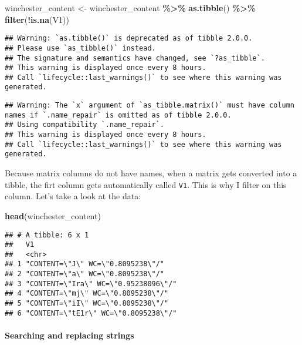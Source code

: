 \documentclass[
]{article}
\newenvironment{Shaded}{\begin{snugshade}}{\end{snugshade}}
\newcommand{\KeywordTok}[1]{\textcolor[rgb]{0.13,0.29,0.53}{\textbf{#1}}}
\newcommand{\NormalTok}[1]{#1}
\newcommand{\OperatorTok}[1]{\textcolor[rgb]{0.81,0.36,0.00}{\textbf{#1}}}
\newcommand{\StringTok}[1]{\textcolor[rgb]{0.31,0.60,0.02}{#1}}
\begin{document}
\begin{Shaded}
\begin{Highlighting}[]
\NormalTok{winchester\_content \textless{}{-}}\StringTok{ }\NormalTok{winchester\_content }\OperatorTok{\%\textgreater{}\%}
\StringTok{  }\KeywordTok{as.tibble}\NormalTok{() }\OperatorTok{\%\textgreater{}\%}
\StringTok{  }\KeywordTok{filter}\NormalTok{(}\OperatorTok{!}\KeywordTok{is.na}\NormalTok{(V1))}
\end{Highlighting}
\end{Shaded}

\begin{verbatim}
## Warning: `as.tibble()` is deprecated as of tibble 2.0.0.
## Please use `as_tibble()` instead.
## The signature and semantics have changed, see `?as_tibble`.
## This warning is displayed once every 8 hours.
## Call `lifecycle::last_warnings()` to see where this warning was generated.
\end{verbatim}

\begin{verbatim}
## Warning: The `x` argument of `as_tibble.matrix()` must have column names if `.name_repair` is omitted as of tibble 2.0.0.
## Using compatibility `.name_repair`.
## This warning is displayed once every 8 hours.
## Call `lifecycle::last_warnings()` to see where this warning was generated.
\end{verbatim}

Because matrix columns do not have names, when a matrix gets converted into a tibble, the firt column
gets automatically called \texttt{V1}. This is why I filter on this column. Let's take a look at the data:

\begin{Shaded}
\begin{Highlighting}[]
\KeywordTok{head}\NormalTok{(winchester\_content)}
\end{Highlighting}
\end{Shaded}

\begin{verbatim}
## # A tibble: 6 x 1
##   V1                                  
##   <chr>                               
## 1 "CONTENT=\"J\" WC=\"0.8095238\"/"   
## 2 "CONTENT=\"a\" WC=\"0.8095238\"/"   
## 3 "CONTENT=\"Ira\" WC=\"0.95238096\"/"
## 4 "CONTENT=\"mj\" WC=\"0.8095238\"/"  
## 5 "CONTENT=\"iI\" WC=\"0.8095238\"/"  
## 6 "CONTENT=\"tE1r\" WC=\"0.8095238\"/"
\end{verbatim}

\hypertarget{searching-and-replacing-strings}{%
\paragraph{Searching and replacing strings}\label{searching-and-replacing-strings}}
\end{document}

